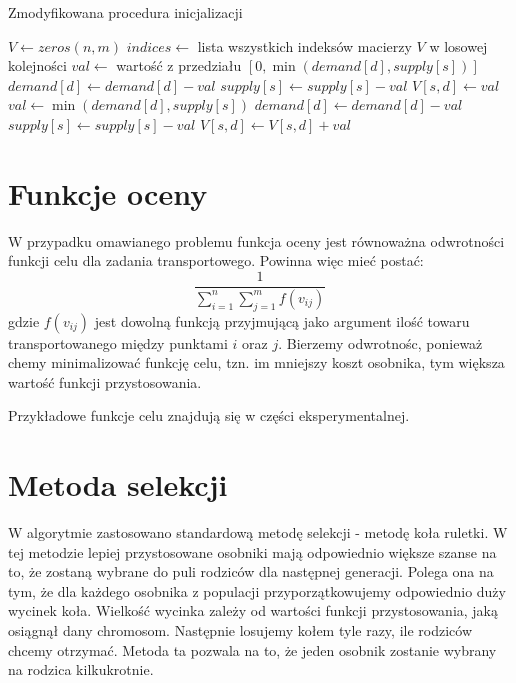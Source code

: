 \begin{pseudokod}[H]
    \label{inicjalizacja-2}
    \caption{Zmodyfikowana procedura inicjalizacji}
    \BlankLine
    $V \gets zeros(n, m)$
    $indices \gets$ lista wszystkich indeksów macierzy $V$ w losowej kolejności\;
    \BlankLine
     {
        $val \gets$ wartość z przedziału $[0, \min(demand[d], supply[s])]$\;
        $demand[d] \gets demand[d] - val$\;
        $supply[s] \gets supply[s] - val$\;
        $V[s, d] \gets val$\;
    }
    \BlankLine
     {
        $val \gets \min(demand[d], supply[s])$\;
        $demand[d] \gets demand[d] - val$\;
        $supply[s] \gets supply[s] - val$\;
        $V[s, d] \gets V[s, d] + val$\;
    }

\end{pseudokod}

\section{Funkcje oceny}
W przypadku omawianego problemu funkcja oceny jest równoważna odwrotności funkcji celu dla zadania transportowego. Powinna więc mieć postać:
$$\frac{1}{\sum_{i=1}^{n}\sum_{j=1}^{m} f(v_{ij})}$$
gdzie $f(v_{ij})$ jest dowolną funkcją przyjmującą jako argument ilość towaru transportowanego między punktami $i$ oraz $j$.
Bierzemy odwrotnośc, ponieważ chemy minimalizować funkcję celu, tzn. im mniejszy koszt osobnika, tym większa wartość funkcji przystosowania.

Przykładowe funkcje celu znajdują się w części eksperymentalnej.

\section{Metoda selekcji}
W algorytmie zastosowano standardową metodę selekcji - metodę koła ruletki. W tej metodzie lepiej przystosowane osobniki mają odpowiednio większe 
szanse na to, że zostaną wybrane do puli rodziców dla następnej generacji. Polega ona na tym, że dla każdego osobnika z populacji 
przyporzątkowujemy odpowiednio duży wycinek koła. Wielkość wycinka zależy od wartości funkcji przystosowania, jaką osiągnął dany chromosom. 
Następnie losujemy kołem tyle razy, ile rodziców chcemy otrzymać. Metoda ta pozwala na to, że jeden osobnik zostanie wybrany na rodzica kilkukrotnie.

